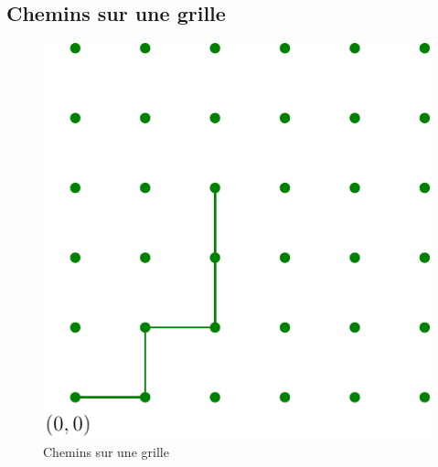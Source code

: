 \subsection{Chemins sur une grille}
\begin{figure}[h!]
  \centering
  \includegraphics{C2007_1.pdf}
  \caption{Chemins sur une grille}
  \label{fig:C2007_1}
\end{figure}

